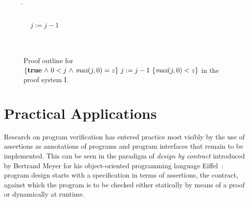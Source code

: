 \documentclass[manuscript, screen, review]{acmart}
\begin{document}
 \begin{figure}[htbp]
 \begin{tabbing}
 \qquad\qquad    
\=       \\
\>                          \\
\>  \ \ $j:=j-1$                               \\
\>                             \\
\>                 \\
\end{tabbing}
\caption{Proof outline for $\mbox{$\{{\mbox{{\bf true}}\mbox{$\ \wedge\ $} 0<j\mbox{$\ \wedge\ $}  \mbox{\it max}(j,0)= z}\}\ {j:=j-1}\ \{{\mbox{\it max}(j,0) < z}\}$}$  in the proof system I.}
\label{fig:po3}

\end{figure}




\section{Practical Applications}
\label{sec:applications}

Research on program verification has entered practice most visibly by
the use of assertions as annotations of programs and program
interfaces that remain to be implemented.  This can be seen in the
paradigm of \emph{design by contract} introduced by Bertrand Meyer for
his object-oriented programming language Eiffel~\cite{Mey97}: program
design starts with a specification in terms of assertions, the
contract, against which the program is to be checked either statically
by means of a proof or dynamically at runtime.
\end{document}
